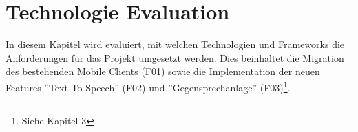\section{Technologie Evaluation}

In diesem Kapitel wird evaluiert, mit welchen Technologien und Frameworks die Anforderungen für das Projekt umgesetzt werden.
Dies beinhaltet die Migration des bestehenden Mobile Clients\cite{ip5} (F01) sowie die Implementation der neuen Features ''Text To Speech'' (F02) und ''Gegensprechanlage'' (F03)\footnote{Siehe Kapitel 3}.




